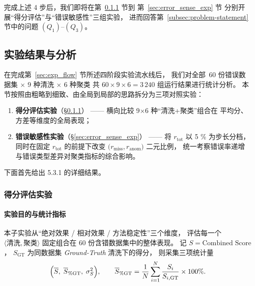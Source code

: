 \documentclass[10pt]{article} %
\numberwithin{equation}{section}
\begin{document}
\noindent
完成上述 4 步后，我们即将在第~\ref{sec:score_eval_exp} 节到
第~\ref{sec:error_sense_exp} 节
分别开展“得分评估”与“错误敏感性”三组实验，
进而回答第~\ref{subsec:problem-statement} 节中的问题 \((Q_1)–(Q_3)\)。

\subsection{\textcolor[rgb]{0.00,0.07,1.00}{实验结果与分析}}
\label{sec:exp_results}

在完成第~\ref{sec:exp_flow} 节所述四阶段实验流水线后，
我们对全部 \(\,60\) 份错误数据集
\(\times\) 9 种清洗 \(\times\) 6 种聚类
共 \(60\times9\times6=3\,240\) 组运行结果进行统计分析。
本节按照由粗略到细致、由全局到局部的思路拆分为三项对照实验：

\begin{enumerate}[leftmargin=2.5em]
  \item \textbf{得分评估实验}（\S\ref{sec:score_eval_exp}）  
        —— 横向比较 9\(\times\)6 种“清洗+聚类”组合在
        平均分、方差等维度的全局表现；
  \item \textbf{错误敏感性实验}（\S\ref{sec:error_sense_exp}）  
        —— 将 \(r_{\text{tot}}\) 以 5 \% 为步长分档，  
        同时在固定 \(r_{\text{tot}}\) 的前提下改变
        \(\bigl(r_{\text{miss}},r_{\text{anom}}\bigr)\) 二元比例，  
        统一考察错误率递增与错误类型差异对聚类指标的综合影响。
\end{enumerate}

下面首先给出 5.3.1 的详细结果。

\subsubsection{\textcolor[rgb]{0.00,0.07,1.00}{得分评估实验}}
\label{sec:score_eval_exp}

\paragraph{实验目的与统计指标}
本子实验从“绝对效果 / 相对效果 / 方法稳定性”三个维度，
评估每一个 \(\langle\!\text{清洗},\text{聚类}\!\rangle\) 固定组合在
60 份含错数据集中的整体表现。
记 \(S=\text{Combined Score}\)，
\(S_{\mathrm{GT}}\) 为同数据集 \textit{Ground-Truth} 清洗下的得分，
则采集三项统计量
\[
  \Bigl(
    \overline{S},\;
    \overline{S}_{\%\mathrm{GT}},\;
    \sigma^{2}_{S}
  \Bigr), \qquad
  \overline{S}_{\%\mathrm{GT}}
    =\frac{1}{N}\sum_{i=1}^{N}\frac{S_i}{S_{i,\mathrm{GT}}}\times100\%.
\]
\end{document}
